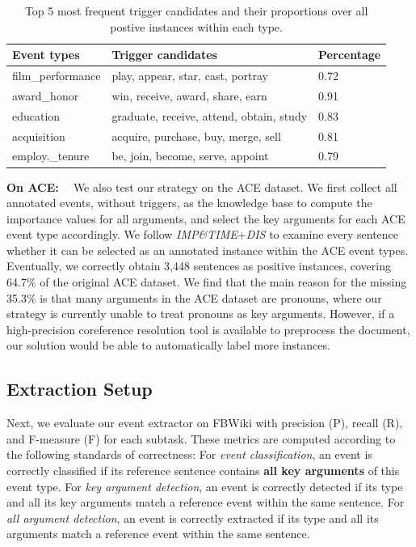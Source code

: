 \begin{table}
	\scriptsize
	\centering
	\begin{tabular}{|l|l|l|} \hline
		Event types & Trigger candidates & Percentage \\ \hline
		film\_performance & play, appear, star, cast, portray & 0.72 \\ \hline
		award\_honor & win, receive, award, share, earn & 0.91 \\ \hline
		education & graduate, receive, attend, obtain, study & 0.83 \\ \hline
		acquisition & acquire, purchase, buy, merge, sell & 0.81 \\ \hline
		employ.\_tenure & be, join, become, serve, appoint & 0.79 \\ \hline
	\end{tabular}
	\caption{Top 5 most frequent trigger candidates and their proportions over all postive instances within each type.}
	\label{freqTriggers}
\end{table}

\noindent\textbf{On ACE: \mbox{ }} We also test our strategy on the ACE dataset. 
We first collect all annotated events, without triggers, as the knowledge base
to compute the importance values for all arguments, and select the key arguments
for each ACE event type accordingly.  We follow \emph{IMP\&TIME}+\emph{DIS} to examine every sentence
whether it can be selected as an annotated instance within the ACE event types.
Eventually, we correctly obtain 3,448 sentences as positive instances, covering 
64.7\% of the original ACE dataset.  We find that the main reason for the 
missing 35.3\% is that many arguments in the ACE dataset are pronouns, 
where our strategy is currently unable to treat pronouns as key arguments. However,
if a high-precision coreference resolution tool is available to preprocess the document,
our solution would be able to automatically label more instances.%

 \subsection{Extraction Setup}\label{sec:evalevent}
Next, we evaluate our event extractor on FBWiki  %
with precision (P), recall (R), and F-measure (F) for each subtask. These metrics are computed according to the following standards of correctness:
For \emph{event classification}, an event is correctly classified if its reference sentence contains \textbf{all key arguments} of this event type.
For \emph{key argument detection}, an event is correctly detected if its type and all its key arguments match a reference event within the same sentence.
For \emph{all argument detection}, an event is correctly extracted if its type and all its arguments match a reference event within the same sentence.

